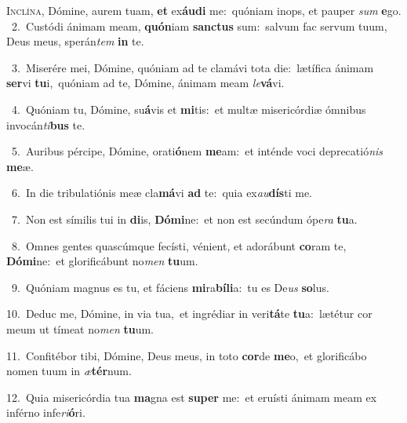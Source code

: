 \lettrine{\initial\textcolor{\initialcolor}{I}}{nclína,} Dómine, aurem tuam, \textbf{et} ex\-\textbf{áu}\-\textbf{di} me:~\star quóniam inops, et pauper \textit{sum} \textbf{e}\-go.\\
{\numbfont\textcolor{\numbcolor}{~2.}}~Custódi ánimam meam, \textbf{quón}\-iam \textbf{sanc}\-\textbf{tus} sum:~\star salvum fac servum tuum, Deus meus, sperán\textit{tem} \textbf{in} te.\par
{\numbfont\textcolor{\numbcolor}{~3.}}~Miserére mei, Dómine, quóniam ad te clamávi tota die:~\dagger lætífica ánimam \textbf{ser}\-vi \textbf{tu}\-i,~\star quóniam ad te, Dómine, ánimam meam \textit{le}\-\textbf{vá}vi.\par
{\numbfont\textcolor{\numbcolor}{~4.}}~Quóniam tu, Dómine, su\-\textbf{á}\-vis et \textbf{mi}\-tis:~\star et multæ misericórdiæ ómnibus invocán\-\textit{ti}\-\textbf{bus} te.\par
{\numbfont\textcolor{\numbcolor}{~5.}}~Auribus pércipe, Dómine, orati\-\textbf{ó}\-nem \textbf{me}\-am:~\star et inténde voci deprecatió\textit{nis} \textbf{me}\-æ.\par
{\numbfont\textcolor{\numbcolor}{~6.}}~In die tribulatiónis meæ cla\-\textbf{má}\-vi \textbf{ad} te:~\star quia ex\-\textit{au}\-\textbf{dís}ti me.\par
{\numbfont\textcolor{\numbcolor}{~7.}}~Non est símilis tui in \textbf{di}\-is, \textbf{Dó}\-\textbf{mi}ne:~\star et non est secúndum ópe\textit{ra} \textbf{tu}\-a.\par
{\numbfont\textcolor{\numbcolor}{~8.}}~Omnes gentes quascúmque fecísti, vénient, et adorábunt \textbf{co}\-ram te, \textbf{Dó}\-\textbf{mi}ne:~\star et glorificábunt no\textit{men} \textbf{tu}\-um.\par
{\numbfont\textcolor{\numbcolor}{~9.}}~Quóniam magnus es tu, et fáciens \textbf{mi}\-ra\-\textbf{bí}\-\textbf{li}a:~\star tu es De\textit{us} \textbf{so}\-lus.\par
{\numbfont\textcolor{\numbcolor}{10.}}~Deduc me, Dómine, in via tua,~\dagger et ingrédiar in veri\-\textbf{tá}\-te \textbf{tu}\-a:~\star lætétur cor meum ut tímeat no\textit{men} \textbf{tu}\-um.\par
{\numbfont\textcolor{\numbcolor}{11.}}~Confitébor tibi, Dómine, Deus meus, in toto \textbf{cor}\-de \textbf{me}\-o,~\star et glorificábo nomen tuum in \textit{æ}\-\textbf{tér}num.\par
{\numbfont\textcolor{\numbcolor}{12.}}~Quia misericórdia tua \textbf{ma}\-gna est \textbf{su}\-\textbf{per} me:~\star et eruísti ánimam meam ex inférno infe\-\textit{ri}\-\textbf{ó}ri.\par
